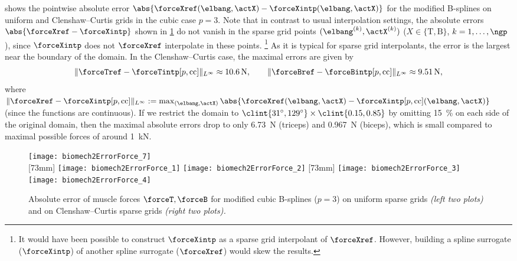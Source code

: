  shows the pointwise absolute error
$\abs{\forceXref(\elbang, \actX) - \forceXintp(\elbang, \actX)}$
for the modified B-splines on uniform and Clenshaw--Curtis grids
in the cubic case $p = 3$.
Note that in contrast to usual interpolation settings,
the absolute errors $\abs{\forceXref - \forceXintp}$
shown in \cref{fig:biomech2ErrorForce} do not vanish in the
sparse grid points $(\elbang^{(k)}, \actX^{(k)})$
($X \in \{\mathrm{T}, \mathrm{B}\}$, $k = 1, \dotsc, \ngp$),
since $\forceXintp$ does not $\forceXref$ interpolate
in these points.%
\footnote{%
  It would have been possible to construct $\forceXintp$
  as a sparse grid interpolant of $\forceXref$.
  However, building a spline surrogate ($\forceXintp$)
  of another spline surrogate ($\forceXref$) would skew the results.%
}
As it is typical for sparse grid interpolants,
the error is the largest near the boundary of the domain.
In the Clenshaw--Curtis case, the maximal errors are given by
\begin{equation}
  \norm[\Linfty]{\forceTref - \forceTintp[p,\cc]}
  \approx \SI{10.6}{\newton},\qquad
  \norm[\Linfty]{\forceBref - \forceBintp[p,\cc]}
  \approx \SI{9.51}{\newton},
\end{equation}
where $\norm[\Linfty]{\forceXref - \forceXintp[p,\cc]}
:= \max_{(\elbang, \actX)}
\abs{\forceXref(\elbang, \actX) - \forceXintp[p,\cc](\elbang, \actX)}$
(since the functions are continuous).
If we restrict the domain to
$\clint{\ang{31}, \ang{129}} \times \clint{0.15, 0.85}$
by omitting \SI{15}{\percent} on each side of the original domain,
then the maximal absolute errors drop to only
\SI{6.73}{\newton} (triceps) and \SI{0.967}{\newton} (biceps),
which is small compared to maximal possible forces of
around \SI{1}{\kilo\newton}.

\begin{figure}
  \texttt{[image: biomech2ErrorForce\_7]}%
  \\[2mm]%
  [73mm]{%
    \texttt{[image: biomech2ErrorForce\_1]}%
    \hfill%
    \texttt{[image: biomech2ErrorForce\_2]}%
  }%
  \hfill%
  [73mm]{%
    \texttt{[image: biomech2ErrorForce\_3]}%
    \hfill%
    \texttt{[image: biomech2ErrorForce\_4]}%
  }%
  \caption[Absolute error of muscle forces]{%
    Absolute error of muscle forces $\forceT, \forceB$ for
    modified cubic B-splines ($p = 3$)
    on uniform sparse grids \emph{(left two plots)} and
    on Clenshaw--Curtis sparse grids \emph{(right two plots).}%
  }%
  \label{fig:biomech2ErrorForce}%
\end{figure}

